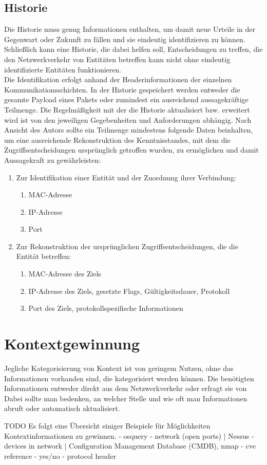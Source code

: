 \subsection{Historie}
Die Historie muss genug Informationen enthalten, um damit neue Urteile in der Gegenwart oder Zukunft zu fällen und sie eindeutig identifizieren zu können. Schließlich kann eine Historie, die dabei helfen soll, Entscheidungen zu treffen, die den Netzwerkverkehr von Entitäten betreffen kann nicht ohne eindeutig identifizierte Entitäten funktionieren.\\ Die Identifikation erfolgt anhand der Headerinformationen der einzelnen Kommunikationsschichten. In der Historie gespeichert werden entweder die gesamte Payload eines Pakets oder zumindest ein ausreichend aussagekräftige Teilmenge. Die Regelmäßigkeit mit der die Historie aktualisiert bzw. erweitert wird ist von den jeweiligen Gegebenheiten und Anforderungen abhängig. Nach Ansicht des Autors sollte ein Teilmenge mindestens folgende Daten beinhalten, um eine ausreichende Rekonstruktion des Kenntnisstandes, mit dem die Zugriffsentscheidungen ursprünglich getroffen wurden, zu ermöglichen und damit Aussagekraft zu gewährleisten:
\begin{enumerate}
\item{Zur Identifikation einer Entität und der Zuordnung ihrer Verbindung:}
\begin{enumerate}
\item{MAC-Adresse}
\item{IP-Adresse}
\item{Port}
\end{enumerate}
\item{Zur Rekonstruktion der ursprünglichen Zugriffsentscheidungen, die die Entität betreffen:}
\begin{enumerate}
\item{MAC-Adresse des Ziels}
\item{IP-Adresse des Ziels, gesetzte Flags, Gültigkeitsdauer, Protokoll}
\item{Port des Ziels, protokollspezifische Informationen}
\end{enumerate}

\end{enumerate}

\section{Kontextgewinnung}
Jegliche Kategorisierung von Kontext ist von geringem Nutzen, ohne das Informationen vorhanden sind, die kategorisiert werden können.
Die benötigten Informationen entweder direkt aus dem Netzwerkverkehr oder erfragt sie von 
Dabei sollte man bedenken, an welcher Stelle und wie oft man Informationen abruft oder automatisch aktualisiert. \cite{perera_context_2014}

TODO
Es folgt eine Übersicht einiger Beispiele für Möglichkeiten Kontextinformationen zu gewinnen. 
- osquery
- network (open ports) | Nessus
- devices in network | Configuration Management Database (CMDB), nmap   
- cve reference - yes/no
- protocol header